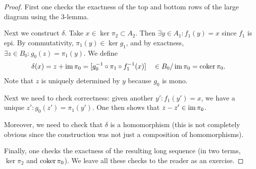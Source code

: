\begin{lem}
\end{lem}
\begin{proof}
    First one checks the exactness of the top and bottom rows of the large diagram using the 3-lemma.
    
    Next we construct $\delta$. Take $x\in \ker\pi_2\subset A_2$. Then $\exists y\in A_1:f_1(y)=x$ since $f_1$ is epi. By commutativity, $\pi_1(y)\in\ker g_1$, and by exactness, $\exists z\in B_0:g_0(z)=\pi_1(y)$. We define
    \[\delta(x)=z+\operatorname{im} \pi_0=[g_0^{-1}\circ\pi_1\circ f_1^{-1}(x)]\quad \in B_0/\operatorname{im}\pi_0=\operatorname{coker}\pi_0.\]
    Note that $z$ is uniquely determined by $y$ because $g_0$ is mono.
    
    Next we need to check correctness: given another $y': f_1(y')=x$, we have a unique $z':g_0(z')=\pi_1(y')$. One then shows that $z-z'\in \operatorname{im}\pi_0$.
    
    Moreover, we need to check that $\delta$ is a homomorphism (this is not completely obvious since the construction was not just a composition of homomorphisms).
    
    Finally, one checks the exactness of the resulting long sequence (in two terms, $\ker\pi_2$ and $\operatorname{coker}\pi_0$). We leave all these checks to the reader as an exercise.
\end{proof}


